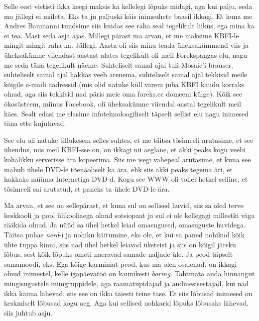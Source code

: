 Selle eest vististi ikka keegi maksis ka kellelegi lõpuks midagi, aga kui palju, 
seda ma jällegi ei mäleta. Eks ta ju paljuski käis inimsuhete baasil ikkagi. Et 
kuna me Andres Baumanni tundsime siis kuidas see raha
seal tegelikult  liikus, ega mina ka ei tea. Mast seda asja 
ajas. Millegi pärast ma arvan, et  me maksime KBFI-le mingit mingit raha ka. 
Jällegi. Aasta oli siis minu teada üheksakümmend viis ja 
üheksakümne viiendast aastast alates tegelikult oli meil 
Forekspangas elu, nagu me seda täna tegelikult näeme. 
Suhteliselt samal ajal tuli Mosaic'i brauser, suhteliselt samal ajal hakkas veeb arenema, 
suhteliselt samal ajal tekkisid meile kõigile e-maili aadressid (mis olid 
natuke küll varem juba KBFI kaudu  korraks olnud, aga siis tekkisid nad päris 
meie oma foreks.ee domeeni külge). Kõik see ökosüsteem, miinus Facebook, oli 
üheksakümne viiendal aastal tegelikult meil käes. Sealt edasi me 
elasime infotehnoloogiliselt täpselt sellist elu nagu inimesed täna ette 
kujutavad. 

See elu oli natuke tillukesem selles suhtes, et me täitsa tõsimeeli arutasime, 
et see ühendus, mis meil KBFI-sse on, on ikkagi nii aeglane, et äkki peaks kogu 
veebi kohalikku serverisse ära kopeerima. Siis me isegi vahepeal arutasime, et 
kuna see mahub ühele DVD-le tõenäoliselt ka ära, ehk siis äkki peaks tegema 
äri, et hakkaks müüma Internetiga DVD-d. Kogu see WWW oli tollel hetkel selline, et tõsimeeli sai arutatud, et paneks ta ühele DVD-le ära. 


Ma arvan, et see on sellepärast, et kuna sul on sellised huvid, siis sa oled 
terve keskkooli ja pool ülikooliaega olnud sotsiopaat ja sul ei ole kellegagi millestki väga rääkida olnud. Ja nüüd sa ühel hetkel leiad omasugused, 
omasuguste huvidega. Täitsa puhas \emph{nerd}-i ja nohiku käitumine, eks ole, et 
kui sa paned  nohikud  kõik ühte tuppa kinni, siis nad ühel hetkel leiavad 
üksteist ja siis on kõigil järsku lõbus, sest kõik lõpuks ometi naeravad samade naljade üle. Ja peod täpselt samamoodi, eks. Ega kõige karmimat peod, kus ma 
olen  osalenud, on ikkagi olnud inimestel, kelle igapäevatöö on kaunikesti 
\emph{boring}. Tahtmata anda hinnangut mingisugustele inimgruppidele, aga   
raamatupidajad ja  andmesisestajad, kui nad ikka käima lähevad, siis see on 
ikka täiesti teine tase. Et siis lõbusad inimesed on keskmiselt lõbusad 
kogu aeg. Aga kui sellised nohkarid lõpuks lõbusaks lähevad, siis juhtub asju.

